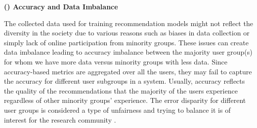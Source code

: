 




\vspace{0.25cm}
\noindent \textbf{() Accuracy and Data Imbalance}
\vspace{0.25cm}

The collected data used for training recommendation models might not reflect the diversity in the society due to various reasons such as biases in data collection or simply lack of online participation from minority groups. These issues can create data imbalance leading to accuracy imbalance between the majority user group(s) for whom we have more data versus minority groups with less data. Since accuracy-based metrics are aggregated over all the users, they may fail to capture the accuracy for different user subgroups in a system. Usually, accuracy reflects the quality of the recommendations that the majority of the users experience regardless of other minority groups' experience. The error disparity for different user groups is considered a type of unfairness and trying to balance it is of interest for the research community \cite{ekstrand2018all,yao2017beyond}.

